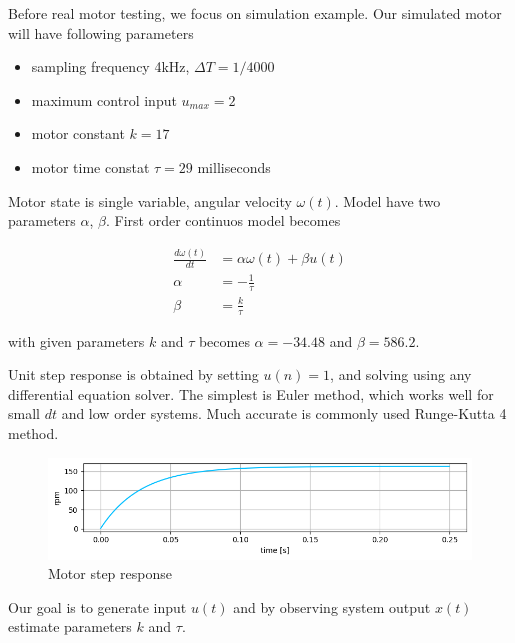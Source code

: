 \documentclass[12pt,twoside,onecolumn,openany,extrafontsizes,dvipsnames]{memoir}
\begin{document}
        Before real motor testing, we focus on simulation example.
        Our simulated motor will have following parameters

        \begin{itemize}
            \item sampling frequency 4kHz, $\Delta T = 1/4000$
            \item maximum control input $u_{max} = 2$
            \item motor constant $k = 17$
            \item motor time constat $\tau = 29$ milliseconds
        \end{itemize}

        Motor state is single variable, angular velocity $\omega(t)$. Model have two parameters $\alpha$, $\beta$. 
        First order continuos model becomes

        \begin{align}
            \frac{d\omega(t)}{dt} &= \alpha \omega(t) + \beta u(t) \label{eq:first_order_system_a} \\
            \alpha &= -\frac{1}{\tau}  \label{eq:first_order_system_b}  \\
            \beta &= \frac{k}{\tau}  \label{eq:first_order_system_c} 
        \end{align}

        with given parameters $k$ and $\tau$ becomes $\alpha = -34.48$ and $\beta = 586.2$.

        Unit step response is obtained by setting $u(n) = 1$, and solving using any differential 
        equation solver. The simplest is Euler method, which works well for small $dt$ and low order 
        systems. Much accurate is commonly used Runge-Kutta 4 method.

        \begin{figure}[!htb]
            \centering
            \includegraphics[scale=0.6]{../images/motor_control/motor_step_response.png}
            \caption{Motor step response}
            \label{fig:motor_step_response}
        \end{figure}

        Our goal is to generate input $u(t)$ and by observing system output $x(t)$ estimate parameters
        $k$ and $\tau$.
\end{document}
